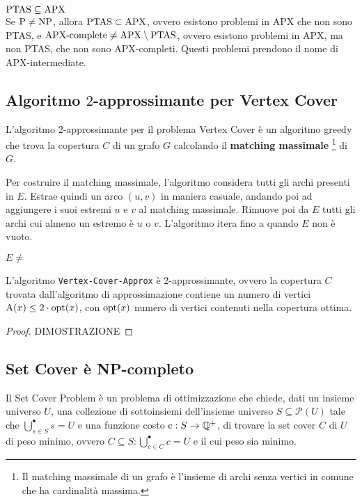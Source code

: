 \begin{rem}
    $\textnormal{PTAS} \subseteq \textnormal{APX}$\\
    Se $\textnormal{P} \neq \textnormal{NP}$, allora $\textnormal{PTAS} \subset \textnormal{APX}$, ovvero
    esistono problemi in APX che non sono PTAS, e
    $\textnormal{APX-complete} \neq \textnormal{APX} \setminus \textnormal{PTAS}$,
    ovvero esistono problemi in APX, ma non PTAS, che non sono APX-completi.
    Questi problemi prendono il nome di APX-intermediate.
\end{rem}

\subsection{Algoritmo $2$-approssimante per Vertex Cover}
L'algoritmo $2$-approssimante per il problema Vertex Cover è un algoritmo
greedy che trova la copertura $C$ di un grafo $G$ calcolando il
\textbf{matching massimale} \footnote{Il matching massimale di un grafo è
l'insieme di archi senza vertici in comune che ha cardinalità massima.} di $G$.

Per costruire il matching massimale, l'algoritmo considera tutti gli archi
presenti in $E$. Estrae quindi un arco $(u,v)$ in maniera casuale, andando
poi ad aggiungere i suoi estremi $u$ e $v$ al matching massimale.
Rimuove poi da $E$ tutti gli archi cui almeno un estremo è $u$ o $v$.
L'algoritmo itera fino a quando $E$ non è vuoto.

\begin{codebox}
    \li \While $E \neq $
    \End
\end{codebox}

\begin{thm}
    L'algoritmo \verb|Vertex-Cover-Approx| è $2$-approssimante, ovvero la
    copertura $C$ trovata dall'algoritmo di approssimazione contiene un
    numero di vertici $\textnormal{A}(x) \le 2 \cdot \textnormal{opt}(x)$, con $\textnormal{opt}(x)$ numero
    di vertici contenuti nella copertura ottima.
\end{thm}

\begin{proof}
    DIMOSTRAZIONE
\end{proof}

\subsection{Set Cover è NP-completo}
Il Set Cover Problem è un problema di ottimizzazione che chiede, dati un
insieme universo $U$, una collezione di sottoinsiemi dell'insieme universo
$S \subseteq \mathcal{P}(U)$ tale che
$\bigcup\limits_{s \in S}^{\bullet} s = U$ e una funzione costo
$\textnormal{c}: S \rightarrow \mathbb{Q}^+$, di trovare la set cover $C$ di $U$ di
peso minimo, ovvero $C \subseteq S : \bigcup\limits_{c \in C}^{\bullet} c = U$
e il cui peso sia minimo.


